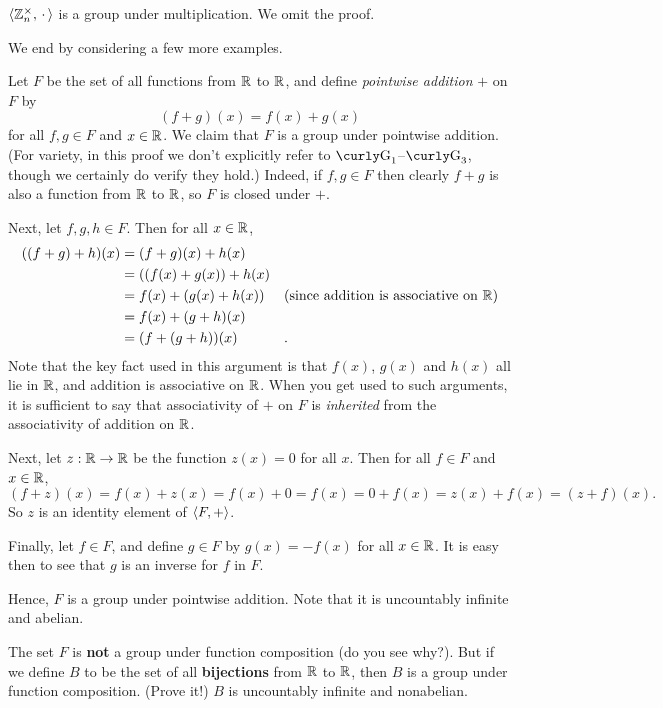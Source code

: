 \begin{example}{}
$\langle\mathbb{Z}_n^{\times},\,\cdot\, \rangle$ is a group under multiplication.  We omit the proof. \end{example}

We end by considering a few more examples.

\begin{example}{} Let $F$ be the set of all functions from $\mathbb{R}$ to $\mathbb{R}$, and define \textit{pointwise addition} $+$ on $F$ by
$$(f+g)(x)=f(x)+g(x)$$ for all $f,g\in F$ and $x\in \mathbb{R}$. We claim that $F$ is a group under pointwise
addition. (For variety, in this proof we don't explicitly refer
to $\G_1$--$\G_3$, though we certainly do verify they hold.)
Indeed, if $f,g\in F$ then clearly $f+g$ is also a function
from $\mathbb{R}$ to $\mathbb{R}$, so $F$ is closed under $+$.

Next, let $f,g,h\in F$.  Then for all $x\in \mathbb{R}$,
\begin{align*}
((f+g)+h)(x)&=(f+g)(x)+h(x)&&\\
&=((f(x)+g(x))+h(x)&&\\
&=f(x)+(g(x)+h(x))&&\text{(since addition is associative on
$\mathbb{R}$)}\\
&=f(x)+(g+h)(x)&&\\
&=(f+(g+h))(x)&&.\end{align*} Note
that the key fact used in this argument is that $f(x)$, $g(x)$ and
$h(x)$ all lie in $\mathbb{R}$, and addition is associative on $\mathbb{R}$.
When you get used to such arguments, it is sufficient to say that
associativity of $+$ on $F$ is \textit{inherited} from the
associativity of addition on $\mathbb{R}$.

Next, let $z:\mathbb{R}\to\mathbb{R}$ be the function $z(x)=0$ for all $x$.  Then for all $f\in F$ and $x\in \mathbb{R}$, $$(f+z)(x)=f(x)+z(x)=f(x)+0=f(x)=0+f(x)=z(x)+f(x)=(z+f)(x).$$ So $z$ is an identity element of $\langle F,+\rangle$.

Finally, let $f\in F$, and define $g\in F$ by $g(x)=-f(x)$ for all $x\in \mathbb{R}$.  It is easy then to see that $g$ is an inverse for $f$ in $F$.

Hence, $F$ is a group under pointwise addition. Note that it is uncountably infinite and abelian. \end{example}

\begin{example}{}The set $F$ is \textbf{not} a group under function composition (do you see why?). But if we define $B$ to be the set of all \textbf{bijections} from $\mathbb{R}$ to $\mathbb{R}$, then $B$ is a group under function composition. (Prove it!) $B$ is uncountably infinite and nonabelian. \end{example}

